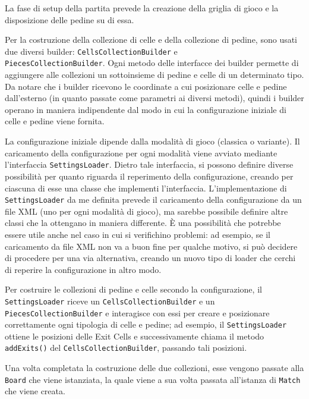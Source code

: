 \documentclass[a4paper,12pt]{report}
\begin{document}
La fase di setup della partita prevede la creazione della griglia di gioco e la disposizione delle pedine su di essa. 

Per la costruzione della collezione di celle e della collezione di pedine, sono usati due diversi builder: \texttt{CellsCollectionBuilder} e \\ \texttt{PiecesCollectionBuilder}. Ogni metodo delle interfacce dei builder permette di aggiungere alle collezioni un sottoinsieme di pedine e celle di un determinato tipo. Da notare che i builder ricevono le coordinate a cui posizionare celle e pedine dall'esterno (in quanto passate come parametri ai diversi metodi), quindi i builder operano in maniera indipendente dal modo in cui la configurazione iniziale di celle e pedine viene fornita.

La configurazione iniziale dipende dalla modalità di gioco (classica o variante). Il caricamento della configurazione per ogni modalità viene avviato mediante l'interfaccia \texttt{SettingsLoader}. Dietro tale interfaccia, si possono definire diverse possibilità per quanto riguarda il reperimento della configurazione, creando per ciascuna di esse una classe che implementi l'interfaccia. L'implementazione di \texttt{SettingsLoader} da me definita prevede il caricamento della configurazione da un file XML (uno per ogni modalità di gioco), ma sarebbe possibile definire altre classi che la ottengano in maniera differente. È una possibilità che potrebbe essere utile anche nel caso in cui si verifichino problemi: ad esempio, se il caricamento da file XML non va a buon fine per qualche motivo, si può decidere di procedere per una via alternativa, creando un nuovo tipo di loader che cerchi di reperire la configurazione in altro modo.

Per costruire le collezioni di pedine e celle secondo la configurazione, il \texttt{SettingsLoader} riceve un \texttt{CellsCollectionBuilder} e un \\ \texttt{PiecesCollectionBuilder} e interagisce con essi per creare e posizionare correttamente ogni tipologia di celle e pedine; ad esempio, il \texttt{SettingsLoader} ottiene le posizioni delle Exit Cells e successivamente chiama il metodo \texttt{addExits()} del \texttt{CellsCollectionBuilder}, passando tali posizioni.

Una volta completata la costruzione delle due collezioni, esse vengono passate alla \texttt{Board} che viene istanziata, la quale viene a sua volta passata all'istanza di \texttt{Match} che viene creata.
\end{document}

